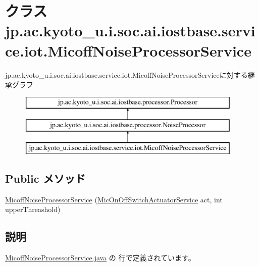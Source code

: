 \hypertarget{classjp_1_1ac_1_1kyoto__u_1_1i_1_1soc_1_1ai_1_1iostbase_1_1service_1_1iot_1_1_micoff_noise_processor_service}{\section{クラス jp.\-ac.\-kyoto\-\_\-u.\-i.\-soc.\-ai.\-iostbase.\-service.\-iot.\-Micoff\-Noise\-Processor\-Service}
\label{classjp_1_1ac_1_1kyoto__u_1_1i_1_1soc_1_1ai_1_1iostbase_1_1service_1_1iot_1_1_micoff_noise_processor_service}
}
jp.\-ac.\-kyoto\-\_\-u.\-i.\-soc.\-ai.\-iostbase.\-service.\-iot.\-Micoff\-Noise\-Processor\-Serviceに対する継承グラフ\begin{figure}[H]
\begin{center}
\leavevmode
\includegraphics[height=3.000000cm]{classjp_1_1ac_1_1kyoto__u_1_1i_1_1soc_1_1ai_1_1iostbase_1_1service_1_1iot_1_1_micoff_noise_processor_service}
\end{center}
\end{figure}
\subsection*{Public メソッド}
\begin{DoxyCompactItemize}
\item 
\hyperlink{classjp_1_1ac_1_1kyoto__u_1_1i_1_1soc_1_1ai_1_1iostbase_1_1service_1_1iot_1_1_micoff_noise_processor_service_ac2f31be2590f187aa779e8dfb38b867b}{Micoff\-Noise\-Processor\-Service} (\hyperlink{classjp_1_1ac_1_1kyoto__u_1_1i_1_1soc_1_1ai_1_1iostbase_1_1service_1_1iot_1_1_mic_on_off_switch_actuator_service}{Mic\-On\-Off\-Switch\-Actuator\-Service} act, int upper\-Threashold)
\end{DoxyCompactItemize}


\subsection{説明}


 \hyperlink{_micoff_noise_processor_service_8java_source}{Micoff\-Noise\-Processor\-Service.\-java} の  行で定義されています。



